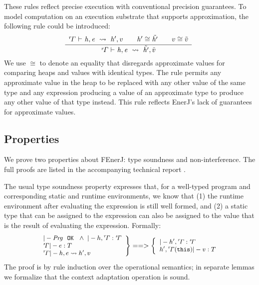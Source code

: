 \noindent
These rules reflect precise execution with conventional precision
guarantees.
To model computation on an execution substrate that supports approximation,
the following rule could be introduced:
%
\[
\ottdruleosXXapprox{}
\]
%
We use $\cong$ to denote an equality that disregards approximate
values for comparing heaps and values with identical types.
The rule permits any
approximate value in the heap to be replaced with any other value
of the same type
and any expression producing a value of an approximate type to
produce any other value of that type instead.
This rule reflects EnerJ's
lack of guarantees for approximate values.



\subsection{Properties}

We prove two properties about FEnerJ: type soundness and
non-interference. The full proofs are listed in the accompanying
technical report \cite{EnerJ-TR}.

The usual type soundness property expresses that, for a well-typed
program and corresponding static and runtime environments, we know
that
(1) the runtime environment after evaluating the expression is still
well formed, and
(2) a static type that can be assigned to the expression can also be
assigned to the value that is the result of evaluating the expression.
Formally:
\[
\small
\left.
\begin{array}{l}
|- \mathit{Prg}\ \ \mathtt{OK}\ \ \wedge\  |- h, \mathit{^{r}\!\Gamma} : \mathit{^{s}\!\Gamma}\\
\mathit{^{s}\!\Gamma} |- e : T\\
\mathit{^{r}\!\Gamma} |- h, e \leadsto h', v\\
\end{array}
\right\} ==> \left\{
\begin{array}{l}
|- h', \mathit{^{r}\!\Gamma} : \mathit{^{s}\!\Gamma}\\
h', \mathit{^{r}\!\Gamma}(\mathtt{this}) |- v : T\\
\end{array}
\right.
\]
The proof is by rule induction over the operational semantics; in
separate lemmas we formalize that the context adaptation operation
\comb{} is sound.



